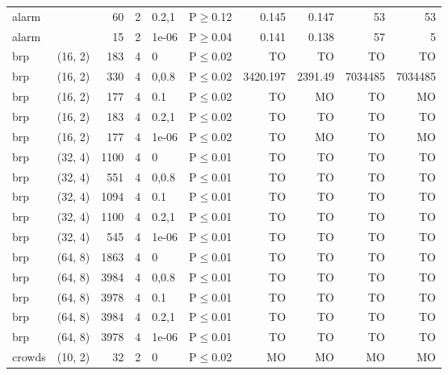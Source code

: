 \begin{longtable}{llrrllrrrr}
 alarm         &          &     	60 &   2 & 0.2,1 & P$\geq$0.12  & 0.145    & 0.147   & 53      & 53      \\
 alarm         &          &     	15 &   2 & 1e-06 & P$\geq$0.04  & 0.141    & 0.138   & 57      & 5       \\
 brp           & (16, 2)  &    	183 &   4 & 0     & P$\leq$0.02  & TO       & TO      & TO      & TO      \\
 brp           & (16, 2)  &    	330 &   4 & 0,0.8 & P$\leq$0.02  & 3420.197 & 2391.49 & 7034485 & 7034485 \\
 brp           & (16, 2)  &    	177 &   4 & 0.1   & P$\leq$0.02  & TO       & MO      & TO      & MO      \\
 brp           & (16, 2)  &    	183 &   4 & 0.2,1 & P$\leq$0.02  & TO       & TO      & TO      & TO      \\
 brp           & (16, 2)  &    	177 &   4 & 1e-06 & P$\leq$0.02  & TO       & MO      & TO      & MO      \\
 brp           & (32, 4)  &   	1100 &   4 & 0     & P$\leq$0.01  & TO       & TO      & TO      & TO      \\
 brp           & (32, 4)  &    	551 &   4 & 0,0.8 & P$\leq$0.01  & TO       & TO      & TO      & TO      \\
 brp           & (32, 4)  &   	1094 &   4 & 0.1   & P$\leq$0.01  & TO       & TO      & TO      & TO      \\
 brp           & (32, 4)  &   	1100 &   4 & 0.2,1 & P$\leq$0.01  & TO       & TO      & TO      & TO      \\
 brp           & (32, 4)  &    	545 &   4 & 1e-06 & P$\leq$0.01  & TO       & TO      & TO      & TO      \\
 brp           & (64, 8)  &   	1863 &   4 & 0     & P$\leq$0.01  & TO       & TO      & TO      & TO      \\
 brp           & (64, 8)  &   	3984 &   4 & 0,0.8 & P$\leq$0.01  & TO       & TO      & TO      & TO      \\
 brp           & (64, 8)  &   	3978 &   4 & 0.1   & P$\leq$0.01  & TO       & TO      & TO      & TO      \\
 brp           & (64, 8)  &   	3984 &   4 & 0.2,1 & P$\leq$0.01  & TO       & TO      & TO      & TO      \\
 brp           & (64, 8)  &   	3978 &   4 & 1e-06 & P$\leq$0.01  & TO       & TO      & TO      & TO      \\
 crowds        & (10, 2)  &     	32 &   2 & 0     & P$\leq$0.02  & MO       & MO      & MO      & MO      \\

\end{longtable}
